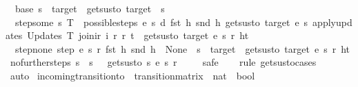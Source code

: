 \begin{isabellebody}
\ \ base{\isacharcolon}\ {\isachardoublequoteopen}s\ {\isacharequal}\ target\ {\isasymLongrightarrow}\ gets{\isacharunderscore}us{\isacharunderscore}to\ target\ {\isacharunderscore}\ s\ {\isacharunderscore}\ {\isacharbrackleft}{\isacharbrackright}{\isachardoublequoteclose}\ {\isacharbar}\isanewline
\ \ step{\isacharunderscore}some{\isacharcolon}\ {\isachardoublequoteopen}{\isasymexists}{\isacharparenleft}s{\isacharprime}{\isacharcomma}\ T{\isacharparenright}\ {\isacharbar}{\isasymin}{\isacharbar}\ possible{\isacharunderscore}steps\ e\ s\ d\ {\isacharparenleft}fst\ h{\isacharparenright}\ {\isacharparenleft}snd\ h{\isacharparenright}{\isachardot}\ gets{\isacharunderscore}us{\isacharunderscore}to\ target\ e\ s{\isacharprime}\ {\isacharparenleft}apply{\isacharunderscore}updates\ {\isacharparenleft}Updates\ T{\isacharparenright}\ {\isacharparenleft}join{\isacharunderscore}ir\ i\ r{\isacharparenright}\ r{\isacharparenright}\ t\ {\isasymLongrightarrow}\ gets{\isacharunderscore}us{\isacharunderscore}to\ target\ e\ s\ r\ {\isacharparenleft}h{\isacharhash}t{\isacharparenright}{\isachardoublequoteclose}\ {\isacharbar}\isanewline
\ \ step{\isacharunderscore}none{\isacharcolon}\ {\isachardoublequoteopen}step\ e\ s\ r\ {\isacharparenleft}fst\ h{\isacharparenright}\ {\isacharparenleft}snd\ h{\isacharparenright}\ {\isacharequal}\ None\ {\isasymLongrightarrow}\ s\ {\isacharequal}\ target\ {\isasymLongrightarrow}\ gets{\isacharunderscore}us{\isacharunderscore}to\ target\ e\ s\ r\ {\isacharparenleft}h{\isacharhash}t{\isacharparenright}{\isachardoublequoteclose}\isanewline
\isanewline
{}\isamarkupfalse%
\ no{\isacharunderscore}further{\isacharunderscore}steps{\isacharcolon}\ {\isachardoublequoteopen}s\ {\isasymnoteq}\ s{\isacharprime}\ {\isasymLongrightarrow}\ {\isasymnot}\ gets{\isacharunderscore}us{\isacharunderscore}to\ s\ e\ s{\isacharprime}\ r\ {\isacharbrackleft}{\isacharbrackright}{\isachardoublequoteclose}\isanewline
%
\isadelimproof
\ \ %
\endisadelimproof
%
\isatagproof
{}\isamarkupfalse%
\ safe\isanewline
\ \ \isamarkupfalse%
\ {\isacharparenleft}rule\ gets{\isacharunderscore}us{\isacharunderscore}to{\isachardot}cases{\isacharparenright}\isanewline
\ \ \isamarkupfalse%
\ auto%
\endisatagproof
{\isafoldproof}%
%
\isadelimproof
\isanewline
%
\endisadelimproof
\isanewline
{}\isamarkupfalse%
\ incoming{\isacharunderscore}transition{\isacharunderscore}to\ {\isacharcolon}{\isacharcolon}\ {\isachardoublequoteopen}transition{\isacharunderscore}matrix\ {\isasymRightarrow}\ nat\ {\isasymRightarrow}\ bool{\isachardoublequoteclose}\ \isanewline

\end{isabellebody}
